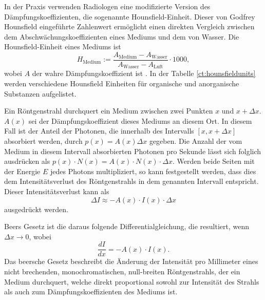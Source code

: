 In der Praxis verwenden Radiologen eine modifizierte Version des Dämpfungskoeffizienten, die sogenannte Hounsfield-Einheit. Dieser von Godfrey Hounsfield eingeführte Zahlenwert ermöglicht einen direkten Vergleich zwischen dem Abschwächungskoeffizienten eines Mediums und dem von Wasser. Die Hounsfield-Einheit eines Mediums ist
%
%
\begin{equation}
	H_{\text{Medium}} := \dfrac{A_{\text{Medium}}-A_{\text{Wasser}}}{A_{\text{Wasser}} - A_{\text{Luft}}} \cdot 1000,
\end{equation}
wobei $A$ der wahre Dämpfungskoeffizient ist \cite{doccheck_hounsfield-skala_nodate}. In der Tabelle \ref{ct:hounsfieldunits} werden verschiedene Hounsfield Einheiten für organische und anorganische Substanzen aufgelistet.

Ein Röntgenstrahl durchquert ein Medium zwischen zwei Punkten $x$ und $x + \Delta x$. $A(x)$ sei der Dämpfungskoeffizient dieses Mediums an diesem Ort. In diesem Fall ist der Anteil der Photonen, die innerhalb des Intervalls $[x, x + \Delta x]$ absorbiert werden, durch $p(x) = A(x)\Delta x$ gegeben. Die Anzahl der vom Medium in diesem Intervall absorbierten Photonen pro Sekunde lässt sich folglich ausdrücken als $p(x) \cdot N(x) = A(x) \cdot N(x) \cdot \Delta x$. Werden beide Seiten mit der Energie $E$ jedes Photons multipliziert, so kann festgestellt werden, dass dies dem Intensitätsverlust des Röntgenstrahls in dem genannten Intervall entspricht. Dieser Intensitätsverlust kann als 
\begin{equation}
	\Delta I \approx -A(x) \cdot I(x) \cdot \Delta x
\end{equation}
ausgedrückt werden.

Beers Gesetz ist die daraus folgende Differentialgleichung, die resultiert, wenn $\Delta x \rightarrow 0$, wobei 
%
\begin{equation}
	\dfrac{dI}{dx} = -A(x)\cdot I(x).
\end{equation}
Das beersche Gesetz beschreibt die Änderung der Intensität pro Millimeter eines nicht brechenden, monochromatischen, null-breiten Röntgenstrahls, der ein Medium durchquert, welche direkt proportional sowohl zur Intensität des Strahls als auch zum Dämpfungskoeffizienten des Mediums ist.

